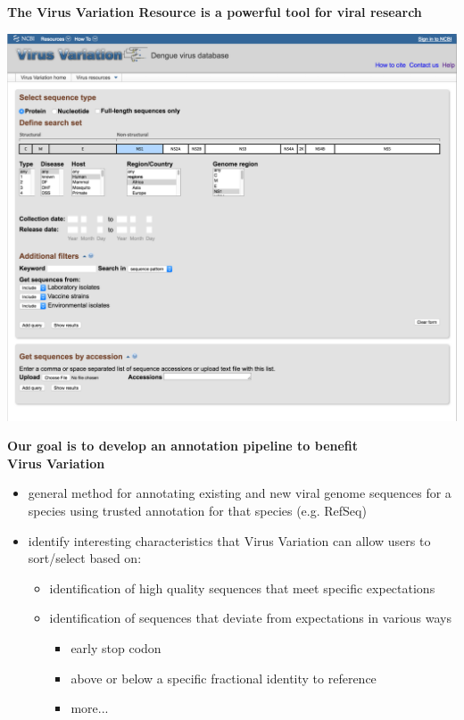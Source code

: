 \documentclass[landscape]{slides}
\begin{document}
\begin{slide}
\begin{center}
\textbf{The Virus Variation Resource is a powerful tool for viral research}

\includegraphics[width=8.5in]{figs/viv-dengue-query}

\vfill
\end{center}
\end{slide}
\begin{slide}
\begin{center}
\textbf{Our goal is to develop an annotation pipeline to benefit \\ Virus Variation}

\small
\begin{itemize}
\item general method for annotating existing and new viral genome
  sequences for a species using trusted annotation for that species (e.g. RefSeq)
\item identify interesting characteristics that Virus Variation can
  allow users to sort/select based on:
\begin{itemize}
  \item identification of high quality sequences that meet specific expectations
  \item identification of sequences that deviate from expectations in
    various ways
    \begin{itemize}
      \item early stop codon
      \item above or below a specific fractional identity to reference 
      \item more...
    \end{itemize}
\end{itemize}
\end{itemize}

\end{center}
\vfill
\end{slide}
\end{document}
